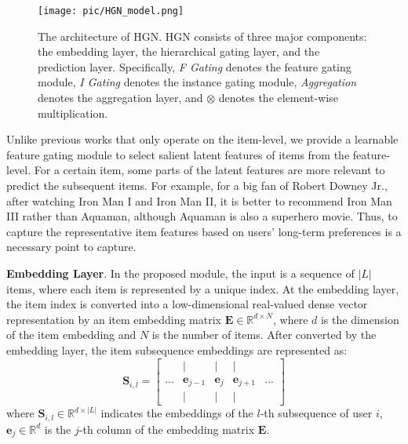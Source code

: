 \documentclass[sigconf]{acmart}
\makeatletter
\def\subsubsection{\@startsection{subsubsection}{3}\z@{.3\linespacing\@plus.7\linespacing}{.1\linespacing}{\normalfont\itshape}}
\makeatother
\begin{document}
\begin{figure*}[t!]
    \centering
    \texttt{[image: pic/HGN\_model.png]}
    \caption{\label{fig:whole_model}The architecture of HGN. HGN consists of three major components: the embedding layer, the hierarchical gating layer, and the prediction layer. Specifically, \textit{F Gating} denotes the feature gating module, \textit{I Gating} denotes the instance gating module, \textit{Aggregation} denotes the aggregation layer, and $ \otimes $ denotes the element-wise multiplication.}
\end{figure*}

\subsubsection{Feature Gating}
Unlike previous works \cite{DBLP:conf/wsdm/TangW18,DBLP:conf/cikm/HidasiK18,DBLP:conf/icdm/KangM18} that only operate on the item-level, we provide a learnable feature gating module to select salient latent features of items from the feature-level. For a certain item, some parts of the latent features are more relevant to predict the subsequent items. For example, for a big fan of Robert Downey Jr., after watching Iron Man I and Iron Man II, it is better to recommend Iron Man III rather than Aquaman, although Aquaman is also a superhero movie. Thus, to capture the representative item features based on users' long-term preferences is a necessary point to capture.

\textbf{Embedding Layer}. In the proposed module, the input is a sequence of $ |L| $ items, where each item is represented by a unique index. At the embedding layer, the item index is converted into a low-dimensional real-valued dense vector representation by an item embedding matrix $ \mathbf{E} \in \mathbb{R}^{d \times N} $, where $ d $ is the dimension of the item embedding and $ N $ is the number of items. After converted by the embedding layer, the item subsequence embeddings are represented as:
\[ 
\mathbf{S}_{i,l} = \begin{bmatrix}
 & | & | & | & \\ 
... & \mathbf{e}_{j-1} & \mathbf{e}_{j} & \mathbf{e}_{j+1} & ... \\ 
 & | & | & | & 
\end{bmatrix}
\]
where $ \mathbf{S}_{i,l} \in \mathbb{R}^{d \times |L|} $ indicates the embeddings of the $ l $-th subsequence of user $ i $, $ \mathbf{e}_{j} \in \mathbb{R}^{d} $ is the $ j $-th column of the embedding matrix $ \mathbf{E} $.
\end{document}
